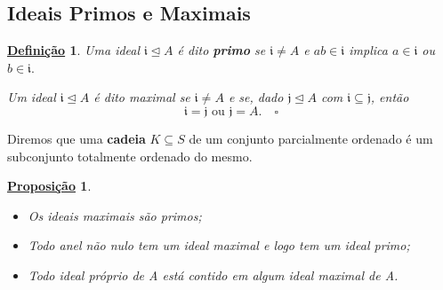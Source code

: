 \documentclass{article}
\newtheorem*{def*}{\underline{Defini\c c\~ao}}
\newtheorem*{prop*}{\underline{Proposi\c c\~ao}}
\begin{document}
\subsection{Ideais Primos e  Maximais}
\begin{def*}
  Uma ideal \(\mathfrak{i} \trianglelefteq{A}\) é dito \textbf{primo} se \(\mathfrak{i}\neq A\) e \(ab\in \mathfrak{i}\)
  implica \(a\in \mathfrak{i}\) ou \(b\in \mathfrak{i}.\) 

  Um ideal \(\mathfrak{i}\trianglelefteq{A}\) é dito maximal se \(\mathfrak{i}\neq A\) e se, dado \(\mathfrak{j}\trianglelefteq{A}\)
  com \(\mathfrak{i}\subseteq{\mathfrak{j}}\), então 
  \[
    \mathfrak{i} = \mathfrak{j}\text{ ou } \mathfrak{j} = A.\quad\square
  \]
\end{def*}
Diremos que uma \textbf{cadeia} \(K\subseteq{S}\) de um conjunto parcialmente ordenado é um subconjunto totalmente
ordenado do mesmo.
\begin{prop*}
  \begin{itemize}
    \item[1)] Os ideais maximais são primos;
    \item[2)] Todo anel não nulo tem um ideal maximal e logo tem um ideal primo;
    \item[3)] Todo ideal próprio de A está contido em algum ideal maximal de A.
  \end{itemize}
\end{prop*}
\end{document}
